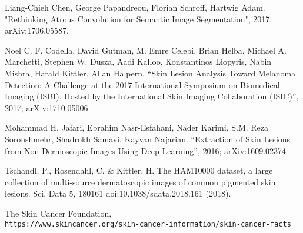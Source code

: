 \documentclass[11pt, letterpaper]{article}
\begin{document}
\begin{thebibliography}{9}
Liang-Chieh Chen, George Papandreou, Florian Schroff, Hartwig Adam. 
"Rethinking Atrous Convolution for Semantic Image Segmentation", 2017; 
arXiv:1706.05587.

Noel C. F. Codella, David Gutman, M. Emre Celebi, Brian Helba, Michael A. Marchetti, Stephen W. Dusza, Aadi Kalloo, Konstantinos Liopyris, Nabin Mishra, Harald Kittler, Allan Halpern. “Skin Lesion Analysis Toward Melanoma Detection: A Challenge at the 2017 International Symposium on Biomedical Imaging (ISBI), Hosted by the International Skin Imaging Collaboration (ISIC)”, 2017; arXiv:1710.05006.

Mohammad H. Jafari, Ebrahim Nasr-Esfahani, Nader Karimi, S.M. Reza Soroushmehr, Shadrokh Samavi, Kayvan Najarian.
“Extraction of Skin Lesions from Non-Dermoscopic Images Using Deep Learning”, 2016;
arXiv:1609.02374

Tschandl, P., Rosendahl, C. \& Kittler, H. The HAM10000 dataset, a large collection of multi-source dermatoscopic images of common pigmented skin lesions. Sci. Data 5, 180161 doi:10.1038/sdata.2018.161 (2018).

The Skin Cancer Foundation,
\\\texttt{https://www.skincancer.org/skin-cancer-information/skin-cancer-facts}
\end{thebibliography}
\end{document}
